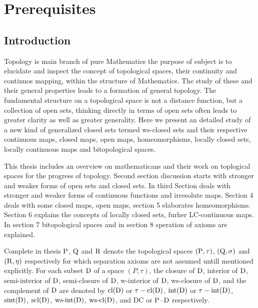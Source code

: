\chapter{Prerequisites}
\graphicspath{{Chapter1/Chapter1Figs/EPS/}{Chapter1/Chapter1Figs/}}


\section{Introduction}

Topology is main branch of pure Mathematics the purpose of subject is to elucidate and inspect the concept of topological spaces, their continuity and continuos mapping, within the structure of Mathematics. The study of these and their general properties leads to a formation of general topology. The fundamental structure on a topological space is not a distance function, but a collection of open sets, thinking directly in terms of open sets often leads to greater clarity as well as greater generality. Here we present an detailed study of a new kind of generalized closed sets termed ws-closed sets and their respective continuous maps, closed maps, open maps, homeomorphisms, locally closed sets, locally continuous maps and bitopological spaces.

This thesis includes an overview on mathematicans and their work on toplogical spaces for the progress of topology. Second section discussion starts with stronger and weaker forms of open sets and closed sets.  In third Section deals with   stronger and weaker forms of continuous functions and irresolute maps. Section 4 deals with some closed maps, open maps, section 5 elaborates homeomorphisms. Section 6 explains the concepts of locally closed sets, furher LC-continuous maps. In section 7 bitopological spaces and in section 8 speration of axioms are explained.

Complete in thesis $\mathrm{P}$, $\mathrm{Q}$ and $\mathrm{R}$ denote the topological spaces $(\mathrm{P},\tau)$, $(\mathrm{Q},\sigma)$ and $(\mathrm{R}, \eta)$ respectively for  which separation axioms are not assumed  untill mentioned explicitly. For each  subset $\mathrm{D}$ of a space $(P, \tau)$, the closure of $\mathrm{D}$, interior of $\mathrm{D}$, semi-interior of $\mathrm{D}$, semi-closure of $\mathrm{D}$, w-interior of $\mathrm{D}$, ws-closure of $\mathrm{D}$, and the complement of $\mathrm{D}$ are denoted by $\mbox{cl}(\mathrm{D})$ or $\tau-\mbox{cl}(\mathrm{D})$, $\mbox{int}(\mathrm{D})$ or $\tau-\mbox{int}(\mathrm{D})$, $\mbox{sint}(\mathrm{D})$, $\mbox{scl}(\mathrm{D})$, $\mbox{ws-int}(\mathrm{D})$, $\mbox{ws-cl}(\mathrm{D})$, and DC or $\mathrm{P}$--$\mathrm{D}$ respectively.

